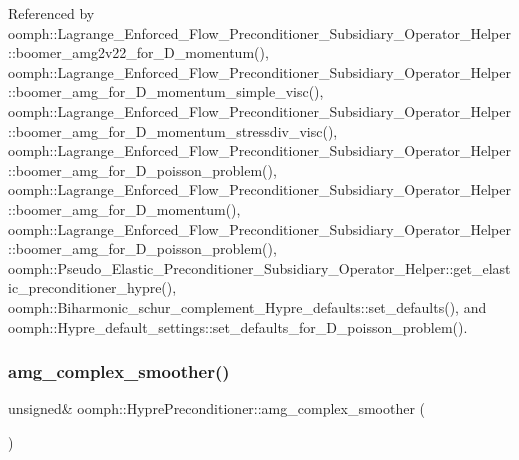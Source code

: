 Referenced by oomph\+::\+Lagrange\+\_\+\+Enforced\+\_\+\+Flow\+\_\+\+Preconditioner\+\_\+\+Subsidiary\+\_\+\+Operator\+\_\+\+Helper\+::boomer\+\_\+amg2v22\+\_\+for\+\_\+D\+\_\+momentum(), oomph\+::\+Lagrange\+\_\+\+Enforced\+\_\+\+Flow\+\_\+\+Preconditioner\+\_\+\+Subsidiary\+\_\+\+Operator\+\_\+\+Helper\+::boomer\+\_\+amg\+\_\+for\+\_\+D\+\_\+momentum\+\_\+simple\+\_\+visc(), oomph\+::\+Lagrange\+\_\+\+Enforced\+\_\+\+Flow\+\_\+\+Preconditioner\+\_\+\+Subsidiary\+\_\+\+Operator\+\_\+\+Helper\+::boomer\+\_\+amg\+\_\+for\+\_\+D\+\_\+momentum\+\_\+stressdiv\+\_\+visc(), oomph\+::\+Lagrange\+\_\+\+Enforced\+\_\+\+Flow\+\_\+\+Preconditioner\+\_\+\+Subsidiary\+\_\+\+Operator\+\_\+\+Helper\+::boomer\+\_\+amg\+\_\+for\+\_\+D\+\_\+poisson\+\_\+problem(), oomph\+::\+Lagrange\+\_\+\+Enforced\+\_\+\+Flow\+\_\+\+Preconditioner\+\_\+\+Subsidiary\+\_\+\+Operator\+\_\+\+Helper\+::boomer\+\_\+amg\+\_\+for\+\_\+D\+\_\+momentum(), oomph\+::\+Lagrange\+\_\+\+Enforced\+\_\+\+Flow\+\_\+\+Preconditioner\+\_\+\+Subsidiary\+\_\+\+Operator\+\_\+\+Helper\+::boomer\+\_\+amg\+\_\+for\+\_\+D\+\_\+poisson\+\_\+problem(), oomph\+::\+Pseudo\+\_\+\+Elastic\+\_\+\+Preconditioner\+\_\+\+Subsidiary\+\_\+\+Operator\+\_\+\+Helper\+::get\+\_\+elastic\+\_\+preconditioner\+\_\+hypre(), oomph\+::\+Biharmonic\+\_\+schur\+\_\+complement\+\_\+\+Hypre\+\_\+defaults\+::set\+\_\+defaults(), and oomph\+::\+Hypre\+\_\+default\+\_\+settings\+::set\+\_\+defaults\+\_\+for\+\_\+D\+\_\+poisson\+\_\+problem().

\mbox{\label{classoomph_1_1HyprePreconditioner_ab4a47036de2b2992259863716f6f9121}} 
\subsubsection{\texorpdfstring{amg\+\_\+complex\+\_\+smoother()}{amg\_complex\_smoother()}}
{\footnotesize\ttfamily unsigned\& oomph\+::\+Hypre\+Preconditioner\+::amg\+\_\+complex\+\_\+smoother (\begin{DoxyParamCaption}{ }\end{DoxyParamCaption})\hspace{0.3cm}{\ttfamily [inline]}}



